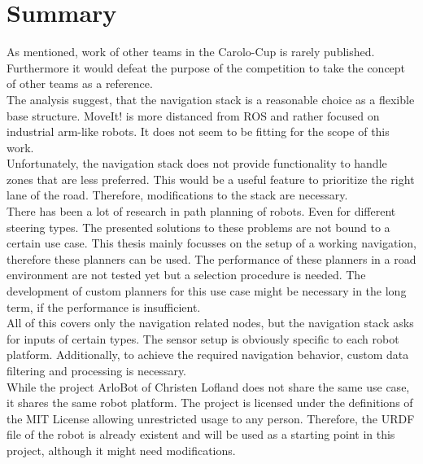\section{Summary}
As mentioned, work of other teams in the Carolo-Cup is rarely published. Furthermore it would defeat the purpose of the competition to take the concept of other teams as a reference.\\

The analysis suggest, that the navigation stack is a reasonable choice as a flexible base structure. MoveIt! is more distanced from ROS and rather focused on industrial arm-like robots. It does not seem to be fitting for the scope of this work.\\

Unfortunately, the navigation stack does not provide functionality to handle zones that are less preferred. This would be a useful feature to prioritize the right lane of the road. Therefore, modifications to the stack are necessary.\\


There has been a lot of research in path planning of robots. Even for different steering types. The presented solutions to these problems are not bound to a certain use case.
This thesis mainly focusses on the setup of a working navigation, therefore these planners can be used. The performance of these planners in a road environment are not tested yet but a selection procedure is needed. The development of custom planners for this use case might be necessary in the long term, if the performance is insufficient.\\

All of this covers only the navigation related nodes, but the navigation stack asks for inputs of certain types. The sensor setup is obviously specific to each robot platform. Additionally, to achieve the required navigation behavior, custom data filtering and processing is necessary.\\


While the project ArloBot of Christen Lofland does not share the same use case, it shares the same robot platform. The project is licensed under the definitions of the MIT License allowing unrestricted usage to any person. Therefore, the URDF file of the robot is already existent and will be used as a starting point in this project, although it might need modifications.













